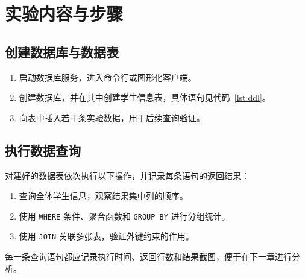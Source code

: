 \chapter{实验内容与步骤}

\section{创建数据库与数据表}

\begin{enumerate}
  \item 启动数据库服务，进入命令行或图形化客户端。
  \item 创建数据库，并在其中创建学生信息表，具体语句见代码~\ref{lst:ddl}。
  \item 向表中插入若干条实验数据，用于后续查询验证。
\end{enumerate}



\section{执行数据查询}

对建好的数据表依次执行以下操作，并记录每条语句的返回结果：

\begin{enumerate}
  \item 查询全体学生信息，观察结果集中列的顺序。
  \item 使用 \verb|WHERE| 条件、聚合函数和 \verb|GROUP BY| 进行分组统计。
  \item 使用 \verb|JOIN| 关联多张表，验证外键约束的作用。
\end{enumerate}

每一条查询语句都应记录执行时间、返回行数和结果截图，便于在下一章进行分析。
